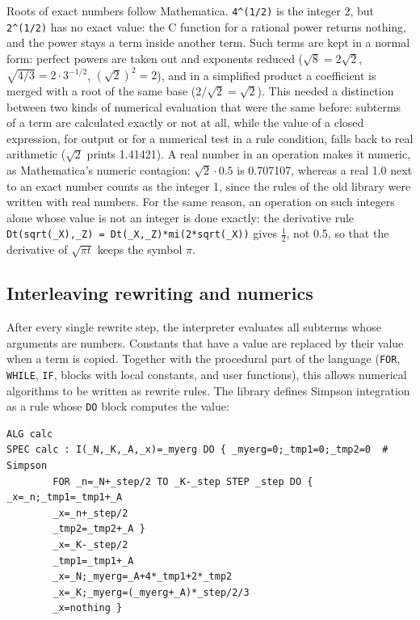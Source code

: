 \documentclass[11pt,a4paper]{article}
\begin{document}
Roots of exact numbers follow Mathematica. \texttt{4\^{}(1/2)} is the
integer 2, but \texttt{2\^{}(1/2)} has no exact value: the C function
for a rational power returns nothing, and the power stays a term inside
another term. Such terms are kept in a normal form: perfect powers are
taken out and exponents reduced ($\sqrt{8}=2\sqrt{2}$,
$\sqrt{4/3}=2\cdot 3^{-1/2}$, $(\sqrt{2})^2=2$), and in a simplified
product a coefficient is merged with a root of the same base
($2/\sqrt{2}=\sqrt{2}$). This needed a distinction between two kinds of
numerical evaluation that were the same before: subterms of a term are
calculated exactly or not at all, while the value of a closed expression,
for output or for a numerical test in a rule condition, falls back to real
arithmetic ($\sqrt{2}$ prints 1.41421). A real number in an operation makes
it numeric, as Mathematica's numeric contagion: $\sqrt{2}\cdot 0.5$ is
0.707107, whereas a real 1.0 next to an exact number counts as the integer
1, since the rules of the old library were written with real numbers. For
the same reason, an operation on such integers alone whose value is not an
integer is done exactly: the derivative rule
\texttt{Dt(sqrt(\_X),\_Z) = Dt(\_X,\_Z)*mi(2*sqrt(\_X))} gives $\frac12$, not
0.5, so that the derivative of $\sqrt{\pi t}$ keeps the symbol $\pi$.

\subsection{Interleaving rewriting and numerics}

After every single rewrite step, the interpreter evaluates all subterms
whose arguments are numbers. Constants that have a value are replaced by
their value when a term is copied. Together with the procedural part of
the language (\texttt{FOR}, \texttt{WHILE}, \texttt{IF}, blocks with local
constants, and user functions), this allows numerical algorithms to be
written as rewrite rules. The library defines Simpson integration as a
rule whose \texttt{DO} block computes the value:

\begin{lstlisting}
ALG calc
SPEC calc : I(_N,_K,_A,_x)=_myerg DO { _myerg=0;_tmp1=0;_tmp2=0  # Simpson
        FOR _n=_N+_step/2 TO _K-_step STEP _step DO { _x=_n;_tmp1=_tmp1+_A
        _x=_n+_step/2
        _tmp2=_tmp2+_A }
        _x=_K-_step/2
        _tmp1=_tmp1+_A
        _x=_N;_myerg=_A+4*_tmp1+2*_tmp2
        _x=_K;_myerg=(_myerg+_A)*_step/2/3
        _x=nothing }
\end{lstlisting}
\end{document}
